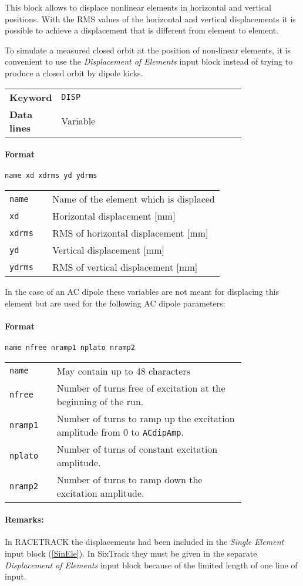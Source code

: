 This block allows to displace nonlinear elements in horizontal and vertical positions.
With the RMS values of the horizontal and vertical displacements it is possible to achieve a displacement that is different from element to element.

To simulate a measured closed orbit at the position of non-linear elements, it is convenient to use the \textit{Displacement of Elements} input block instead of trying to produce a closed orbit by dipole kicks.

\bigskip
\begin{tabular}{@{}lp{0.80\linewidth}}
    \textbf{Keyword} & \texttt{DISP} \\
    \textbf{Data lines} & Variable
\end{tabular}

\paragraph{Format} \texttt{name xd xdrms yd ydrms}

\bigskip
\begin{tabular}{@{}lp{0.80\linewidth}}
    \texttt{name}  & Name of the element which is displaced \\
    \texttt{xd}    & Horizontal displacement [mm] \\
    \texttt{xdrms} & RMS of horizontal displacement [mm] \\
    \texttt{yd}    & Vertical displacement [mm] \\
    \texttt{ydrms} & RMS of vertical displacement [mm]
\end{tabular}

\bigskip
\noindent In the case of an AC dipole these variables are not meant for displacing this element but are used for the following AC dipole parameters:

\paragraph{Format} \texttt{name nfree nramp1 nplato nramp2}

\bigskip
\begin{tabular}{@{}lp{0.80\linewidth}}
    \texttt{name}   & May contain up to 48 characters \\
    \texttt{nfree}  & Number of turns free of excitation at the beginning of the run. \\
    \texttt{nramp1} & Number of turns to ramp up the excitation amplitude from 0 to \texttt{ACdipAmp}. \\
    \texttt{nplato} & Number of turns of constant excitation amplitude. \\
    \texttt{nramp2} & Number of turns to ramp down the excitation amplitude.
\end{tabular}

\paragraph{Remarks:}
In RACETRACK the displacements had been included in the \textit{Single Element} input block (\ref{SinEle}).
In SixTrack they must be given in the separate \textit{Displacement of Elements} input block because of the limited length of one line of input.


